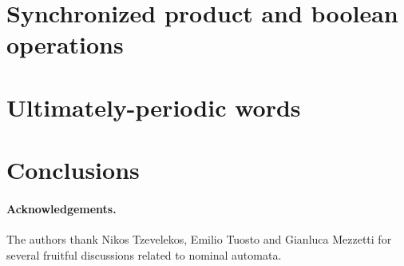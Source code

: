 \documentclass{elsarticle}
\theoremstyle{plain}
\theoremstyle{definition}
\theoremstyle{remark}
\begin{document}
\section{Synchronized product and boolean operations}\label{sec:sync-product}

%


\section{Ultimately-periodic words}\label{sec:up-words}

\section{Conclusions}\label{sec:conclusions}



\paragraph{Acknowledgements.} The authors thank Nikos Tzevelekos, Emilio Tuosto and Gianluca Mezzetti for several fruitful discussions related to nominal automata.



\end{document}
